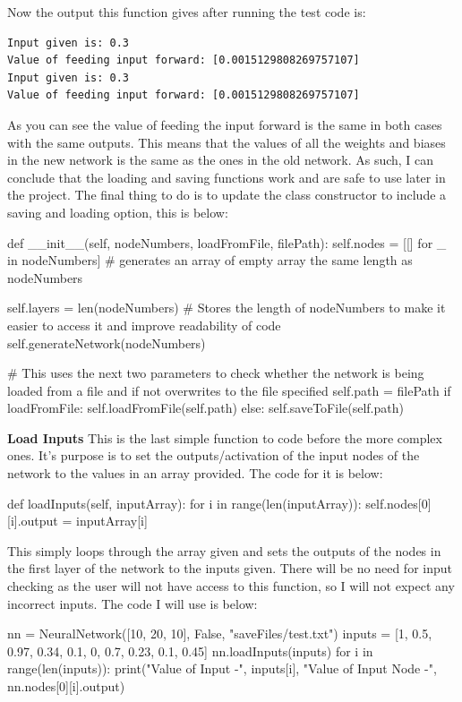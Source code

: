 \documentclass{report}
\begin{document}
Now the output this function gives after running the test code is:
\begin{verbatim}
Input given is: 0.3
Value of feeding input forward: [0.0015129808269757107]
Input given is: 0.3
Value of feeding input forward: [0.0015129808269757107]
\end{verbatim}
As you can see the value of feeding the input forward is the same in both cases with the same outputs. This means that the values of all the weights and biases in the new network is the same as the ones in the old network. As such, I can conclude that the loading and saving functions work and are safe to use later in the project.
\newline
The final thing to do is to update the  class constructor to include a saving and loading option, this is below:
\begin{python}
def __init__(self, nodeNumbers, loadFromFile, filePath):
    self.nodes = [[] for _ in nodeNumbers]  # generates an array of empty array the same length as nodeNumbers

    self.layers = len(nodeNumbers)  # Stores the length of nodeNumbers to make it easier to access it and improve readability of code
    self.generateNetwork(nodeNumbers)

    # This uses the next two parameters to check whether the network is being loaded from a file and if not overwrites to the file specified
    self.path = filePath
    if loadFromFile:
        self.loadFromFile(self.path)
    else:
        self.saveToFile(self.path)
\end{python}
\textbf{Load Inputs}
\newline
\newline
This is the last simple function to code before the more complex ones. It's purpose is to set the outputs/activation of the input nodes of the network to the values in an array provided. The code for it is below:
\begin{python}
def loadInputs(self, inputArray):
    for i in range(len(inputArray)):
        self.nodes[0][i].output = inputArray[i]
\end{python}
This simply loops through the array given and sets the outputs of the nodes in the first layer of the network to the inputs given. There will be no need for input checking as the user will not have access to this function, so I will not expect any incorrect inputs. The code I will use is below:
\begin{python}
nn = NeuralNetwork([10, 20, 10], False, "saveFiles/test.txt")
inputs = [1, 0.5, 0.97, 0.34, 0.1, 0, 0.7, 0.23, 0.1, 0.45]
nn.loadInputs(inputs)
for i in range(len(inputs)):
    print("Value of Input -", inputs[i],
        "Value of Input Node  -", nn.nodes[0][i].output)
\end{python}
\end{document}
